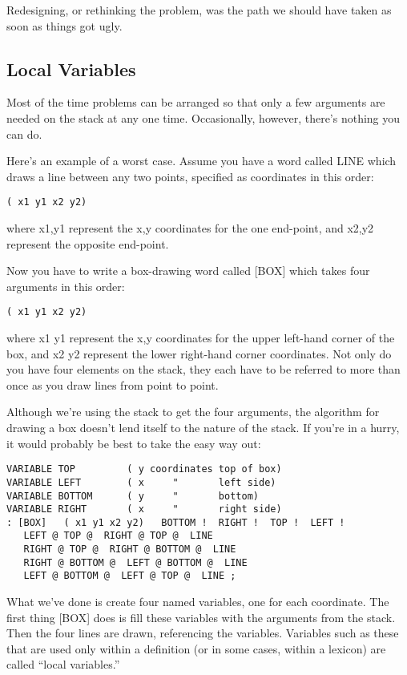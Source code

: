 Redesigning, or rethinking the problem, was the path we should
have taken as soon as things got ugly.

\subsection{Local Variables}

Most of the time problems can be arranged so that only a few arguments
are needed on the stack at any one time. Occasionally, however, there's
nothing you can do.

Here's an example of a worst case. Assume you have a word called
LINE which draws a line between any two points, specified as coordinates
in this order:

\begin{verbatim}
( x1 y1 x2 y2)
\end{verbatim}

where x1,y1 represent the x,y coordinates for the one end-point, and
x2,y2 represent the opposite end-point.

Now you have to write a box-drawing word called [BOX] which
takes four arguments in this order:

\begin{verbatim}
( x1 y1 x2 y2)
\end{verbatim}

where x1 y1 represent the x,y coordinates for the upper left-hand corner
of the box, and x2 y2 represent the lower right-hand corner coordinates.
Not only do you have four elements on the stack, they each have to
be referred to more than once as you draw lines from point to point.

Although we're using the stack to get the four arguments, the algorithm
for drawing a box doesn't lend itself to the nature of the stack. If you're
in a hurry, it would probably be best to take the easy way out:

\begin{verbatim}
VARIABLE TOP         ( y coordinates top of box)
VARIABLE LEFT        ( x     "       left side)
VARIABLE BOTTOM      ( y     "       bottom)
VARIABLE RIGHT       ( x     "       right side)
: [BOX]   ( x1 y1 x2 y2)   BOTTOM !  RIGHT !  TOP !  LEFT !
   LEFT @ TOP @  RIGHT @ TOP @  LINE
   RIGHT @ TOP @  RIGHT @ BOTTOM @  LINE
   RIGHT @ BOTTOM @  LEFT @ BOTTOM @  LINE
   LEFT @ BOTTOM @  LEFT @ TOP @  LINE ;
\end{verbatim}

What we've done is create four named variables, one for each coordinate.
The first thing [BOX] does is fill these variables with the arguments from
the stack. Then the four lines are drawn, referencing the variables.
Variables such as these that are used only within a definition (or in some
cases, within a lexicon) are called ``local variables.''

